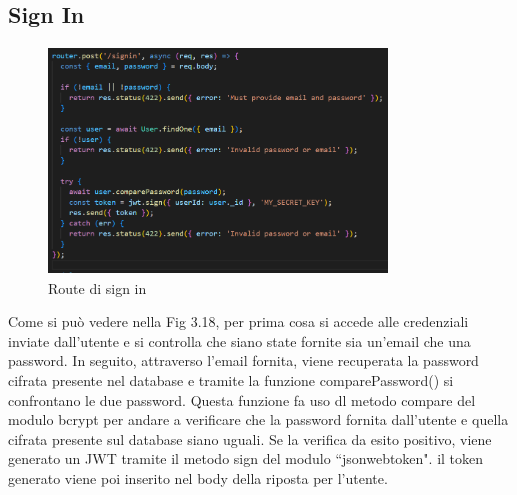 \subsection*{Sign In}

\begin{figure}[H]
   \centering
    \includegraphics[width=9cm, height=6cm]{images/signinServer.png}
    \caption[differenzeiteot]{Route di sign in}
    \label{fig:Route sign in}
\end{figure}

Come si pu\`o vedere nella Fig 3.18, per prima cosa si accede alle credenziali inviate dall'utente e si controlla che siano state fornite sia un'email che una password. In seguito, attraverso l'email fornita, viene recuperata la password cifrata presente
nel database e tramite la funzione comparePassword() si confrontano le due password. Questa funzione fa uso dl metodo compare del modulo bcrypt per andare a verificare che la password fornita dall'utente e quella cifrata presente sul database siano uguali.
 Se la verifica da esito positivo, viene generato un JWT tramite il metodo sign del modulo ``jsonwebtoken". il token generato viene poi inserito nel body della riposta per l'utente.
